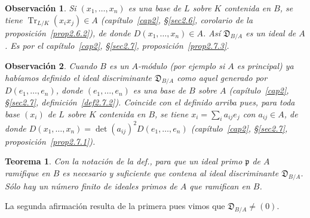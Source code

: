 \documentclass[bibtotoc,leqno,spanish]{amsbook}
\let\emph\relax %
\newcommand{\idl}[1]{\mathfrak{#1}}
\newcommand{\disc}{\mathfrak{D}}
\DeclareMathOperator{\Tr}{Tr}
\numberwithin{equation}{section}
\theoremstyle{note}
\theoremstyle{note}
\newtheorem{theorem}{Teorema}
\theoremstyle{rem}
\newtheorem{remark}{Observaci\'on}
\numberwithin{theorem}{section}
\numberwithin{proposition}{section}
\numberwithin{definition}{section}
\numberwithin{lemma}{section}
\numberwithin{corollary}{section}
\numberwithin{example}{section}
\numberwithin{footnote}{section}%
\begin{document}
\begin{remark}
Si $(x_{1},\dots,x_{n})$ es una base de $L$ sobre $K$ contenida en $B$,
se tiene $\Tr_{L/K}(x_{i}x_{j})\in A$ (cap\'itulo~\ref{cap2}, \S\ref{sec2.6}, corolario de la proposici\'on~\ref{prop2.6.2}), de donde
$D(x_{1},\dots,x_{n})\in A$. As\'i $\disc_{B/A}$ es un ideal \emph{entero} de $A$. Es \emph{no nulo} por
el cap\'itulo~\ref{cap2}, \S\ref{sec2.7}, proposici\'on~\ref{prop2.7.3}.
\end{remark}

\begin{remark}
Cuando $B$ es un $A$-m\'odulo \emph{libre} (por ejemplo si $A$ es principal)
ya hab\'iamos definido el ideal discriminante $\disc_{B/A}$ como aquel generado por $D(e_{1},\dots,e_{n})$,
donde $(e_{1},\dots,e_{n})$ es una base de $B$ sobre $A$ (cap\'itulo~\ref{cap2}, \S\ref{sec2.7}, definici\'on~\ref{def2.7.2}). Coincide
con el definido arriba pues, para toda base $(x_{i})$ de $L$ sobre $K$ contenida en $B$, se tiene
$x_{i} = \sum_{i}a_{ij}e_{j}$ con $a_{ij}\in A$, de donde
$D(x_{1},\dots,x_{n}) = \det(a_{ij})^{2}D(e_{1},\dots,e_{n})$
(cap\'itulo~\ref{cap2}, \S\ref{sec2.7}, proposici\'on~\ref{prop2.7.1}).
\end{remark}

\begin{theorem}\label{teo5.3.1}
Con la notaci\'on de la def., para que un ideal primo $\idl{p}$ de $A$ ramifique en $B$ es necesario y
suficiente que contena al ideal discriminante $\disc_{B/A}$. S\'olo hay un n\'umero finito de
ideales primos de $A$ que ramifican en $B$.
\end{theorem}

La segunda afirmaci\'on resulta de la primera pues vimos que $\disc_{B/A}\neq(0)$.
\end{document}
